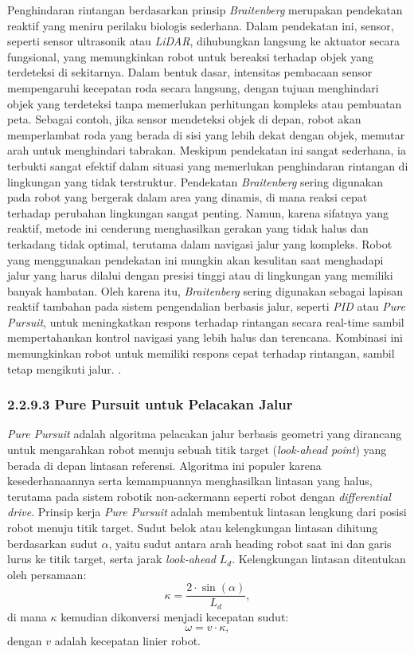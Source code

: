 Penghindaran rintangan berdasarkan prinsip \emph{Braitenberg} merupakan pendekatan reaktif yang meniru perilaku biologis sederhana. Dalam pendekatan ini, sensor, seperti sensor ultrasonik atau \emph{LiDAR}, dihubungkan langsung ke aktuator secara fungsional, yang memungkinkan robot untuk bereaksi terhadap objek yang terdeteksi di sekitarnya. Dalam bentuk dasar, intensitas pembacaan sensor mempengaruhi kecepatan roda secara langsung, dengan tujuan menghindari objek yang terdeteksi tanpa memerlukan perhitungan kompleks atau pembuatan peta. Sebagai contoh, jika sensor mendeteksi objek di depan, robot akan memperlambat roda yang berada di sisi yang lebih dekat dengan objek, memutar arah untuk menghindari tabrakan. Meskipun pendekatan ini sangat sederhana, ia terbukti sangat efektif dalam situasi yang memerlukan penghindaran rintangan di lingkungan yang tidak terstruktur. Pendekatan \emph{Braitenberg} sering digunakan pada robot yang bergerak dalam area yang dinamis, di mana reaksi cepat terhadap perubahan lingkungan sangat penting. Namun, karena sifatnya yang reaktif, metode ini cenderung menghasilkan gerakan yang tidak halus dan terkadang tidak optimal, terutama dalam navigasi jalur yang kompleks. Robot yang menggunakan pendekatan ini mungkin akan kesulitan saat menghadapi jalur yang harus dilalui dengan presisi tinggi atau di lingkungan yang memiliki banyak hambatan. Oleh karena itu, \emph{Braitenberg} sering digunakan sebagai lapisan reaktif tambahan pada sistem pengendalian berbasis jalur, seperti \emph{PID} atau \emph{Pure Pursuit}, untuk meningkatkan respons terhadap rintangan secara real-time sambil mempertahankan kontrol navigasi yang lebih halus dan terencana. Kombinasi ini memungkinkan robot untuk memiliki respons cepat terhadap rintangan, sambil tetap mengikuti jalur. \cite{braitenberg1986vehicles}.


\subsubsection{2.2.9.3 Pure Pursuit untuk Pelacakan Jalur}

\emph{Pure Pursuit} adalah algoritma pelacakan jalur berbasis geometri yang dirancang untuk mengarahkan robot menuju sebuah titik target (\emph{look-ahead point}) yang berada di depan lintasan referensi. Algoritma ini populer karena kesederhanaannya serta kemampuannya menghasilkan lintasan yang halus, terutama pada sistem robotik non-ackermann seperti robot dengan \emph{differential drive}. Prinsip kerja \emph{Pure Pursuit} adalah membentuk lintasan lengkung dari posisi robot menuju titik target. Sudut belok atau kelengkungan lintasan dihitung berdasarkan sudut \( \alpha \), yaitu sudut antara arah heading robot saat ini dan garis lurus ke titik target, serta jarak \emph{look-ahead} \(L_d\). Kelengkungan lintasan ditentukan oleh persamaan:
\begin{equation}
    \kappa = \frac{2 \cdot \sin(\alpha)}{L_d},
\end{equation}
di mana \( \kappa \) kemudian dikonversi menjadi kecepatan sudut:
\begin{equation}
    \omega = v \cdot \kappa,
\end{equation}
dengan \( v \) adalah kecepatan linier robot.

